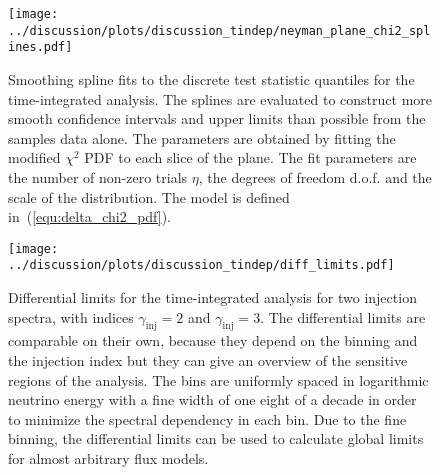 \begin{figure}[H]
  \centering
  \texttt{[image: ../discussion/plots/discussion\_tindep/neyman\_plane\_chi2\_splines.pdf]}
  \caption[Splines for Neyman interval construction in the time-integrated analysis]{
    Smoothing spline fits to the discrete test statistic quantiles for the time-integrated analysis.
    The splines are evaluated to construct more smooth confidence intervals and upper limits than possible from the samples data alone.
    The parameters are obtained by fitting the modified $\chi^2$ PDF to each slice of the plane.
    The fit parameters are the number of non-zero trials $\eta$, the degrees of freedom d.o.f. and the scale of the distribution.
    The model is defined in~(\ref{equ:delta_chi2_pdf}).
  }
  \label{fig:tindep_neyman_plane_chi2_splines}
\end{figure}
\enlargethispage*{5cm}
\begin{figure}[H]
  \centering
  \texttt{[image: ../discussion/plots/discussion\_tindep/diff\_limits.pdf]}
  \caption[Time-integrated analysis differential upper limits]{
    Differential limits for the time-integrated analysis for two injection spectra, with indices $\gamma_\text{inj}=2$ and $\gamma_\text{inj}=3$.
    The differential limits are comparable on their own, because they depend on the binning and the injection index but they can give an overview of the sensitive regions of the analysis.
    The bins are uniformly spaced in logarithmic neutrino energy with a fine width of one eight of a decade in order to minimize the spectral dependency in each bin.
    Due to the fine binning, the differential limits can be used to calculate global limits for almost arbitrary flux models.
  }
  \label{fig:tdep_diff_limits}
\end{figure}

